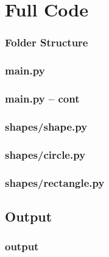 \documentclass{beamer}
\begin{document}
\appendix
\section{Full Code}
  \begin{frame}
    \frametitle{Folder Structure}
  \end{frame}

  \begin{frame}
    \frametitle{main.py}
    
  \end{frame}

  \begin{frame}
    \frametitle{main.py -- cont}
    
  \end{frame}

  \begin{frame}
    \frametitle{shapes/shape.py}
    
  \end{frame}

  \begin{frame}
    \frametitle{shapes/circle.py}
    
  \end{frame}

  \begin{frame}
    \frametitle{shapes/rectangle.py}
    
  \end{frame}

\subsection{Output}
  \begin{frame}
    \frametitle{output}
    
  \end{frame}
\end{document}
